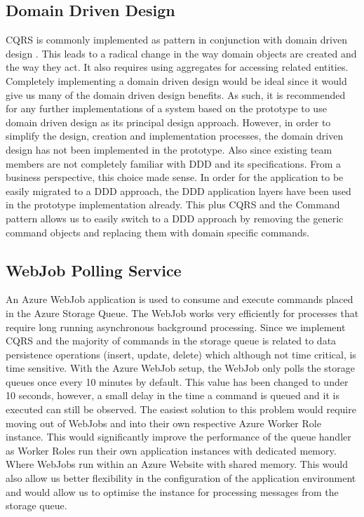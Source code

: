 \subsection{Domain Driven Design}
CQRS  is commonly implemented as pattern in conjunction with domain driven design \cite{Homer2014}. This leads to a radical change in the way domain objects are created and the way they act. It also requires using aggregates for accessing related entities. Completely implementing a domain driven design would be ideal since it would give us many of the domain driven design benefits. As such, it is recommended for any further implementations of a system based on the prototype to use domain driven design as its principal design approach. However, in order to simplify the design, creation and implementation processes, the domain driven design has not been implemented in the prototype. Also since existing team members are not completely familiar with DDD and its specifications. From a business perspective, this choice made sense. In order for the application to be easily migrated to a DDD approach, the DDD application layers have been used in the prototype implementation already. This plus CQRS and the Command pattern  allows us to easily switch to a DDD approach by removing the generic command objects and replacing them with domain specific commands.

\subsection{WebJob Polling Service}
An Azure WebJob application is used to consume and execute commands placed in the Azure Storage Queue. The WebJob works very efficiently for processes that require long running asynchronous background processing. Since we implement CQRS and the majority of commands in the storage queue is related to data persistence operations (insert, update, delete) which although not time critical, is time sensitive. With the Azure WebJob setup, the WebJob only polls the storage queues once every 10 minutes by default. This value has been changed to under 10 seconds, however, a small delay in the time a command is queued and it is executed can still be observed. The easiest solution to this problem would require moving out of WebJobs and into their own respective Azure Worker Role instance. This would significantly improve the performance of the queue handler as Worker Roles run their own application instances with dedicated memory. Where WebJobs run within an Azure Website with shared memory. This would also allow us better flexibility in the configuration of the application environment and would allow us to optimise the instance for processing messages from the storage queue.

